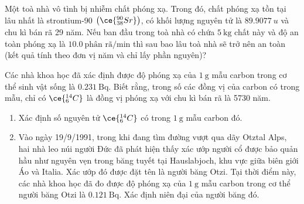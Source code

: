 \begin{ex}
	Một toà nhà vô tình bị nhiễm chất phóng xạ. Trong đó, chất phóng xạ tồn tại lâu nhất là strontium-90 $\left(\ce{^{90}_{38}Sr}\right)$, có khối lượng nguyên tử là $\SI{89.9077}{u}$ và chu kì bán rã 29 năm. Nếu ban đầu trong toà nhà có chứa $\SI{5}{\kilogram}$ chất này và độ an toàn phóng xạ là $\SI{10.0}{\text{phân rã}/\minute}$ thì sau bao lâu toà nhà sẽ trở nên an toàn (kết quả tính theo đơn vị năm và chỉ lấy phần nguyên)?
\end{ex}
\begin{ex}
	Các nhà khoa học đã xác định được độ phóng xạ của $\SI{1}{\gram}$ mẫu carbon trong cơ thể sinh vật sống là $\SI{0.231}{\becquerel}$. Biết rằng, trong số các đồng vị của carbon có trong mẫu, chỉ có $\ce{_6^{14}C}$ là đồng vị phóng xạ với chu kì bán rã là 5730 năm.	
	\begin{enumerate}[label=\alph*)]
		\item Xác định số nguyên tử $\ce{_6^{14}C}$ có trong $\SI{1}{\gram}$ mẫu carbon đó.
		\item Vào ngày 19/9/1991, trong khi đang tìm đường vượt qua dãy Otztal Alps, hai nhà leo núi người Đức đã phát hiện thấy xác ướp người cổ được bảo quản hầu như nguyên vẹn trong băng tuyết tại Hauslabjoch, khu vực giữa biên giới Áo và Italia. Xác ướp đó được đặt tên là người băng Otzi. Tại thời điểm này, các nhà khoa học đã đo được độ phóng xạ của $
		\SI{1}{\gram}$ mẫu carbon trong cơ thể người băng Otzi là $\SI{0.121}{\becquerel}$. Xác định niên đại của người băng đó.
	\end{enumerate}
\end{ex}
